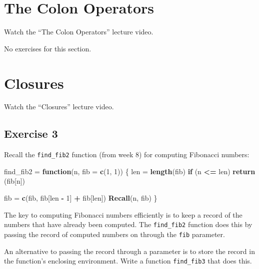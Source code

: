 \documentclass[
]{article}
\newenvironment{Shaded}{\begin{snugshade}}{\end{snugshade}}
\newcommand{\ControlFlowTok}[1]{\textcolor[rgb]{0.13,0.29,0.53}{\textbf{#1}}}
\newcommand{\DataTypeTok}[1]{\textcolor[rgb]{0.13,0.29,0.53}{#1}}
\newcommand{\DecValTok}[1]{\textcolor[rgb]{0.00,0.00,0.81}{#1}}
\newcommand{\KeywordTok}[1]{\textcolor[rgb]{0.13,0.29,0.53}{\textbf{#1}}}
\newcommand{\NormalTok}[1]{#1}
\newcommand{\OperatorTok}[1]{\textcolor[rgb]{0.81,0.36,0.00}{\textbf{#1}}}
\newcommand{\StringTok}[1]{\textcolor[rgb]{0.31,0.60,0.02}{#1}}
\begin{document}
\hypertarget{the-colon-operators}{%
\section{The Colon Operators}\label{the-colon-operators}}

Watch the ``The Colon Operators'' lecture video.

No exercises for this section.

\hypertarget{closures}{%
\section{Closures}\label{closures}}

Watch the ``Closures'' lecture video.

\hypertarget{exercise-3}{%
\subsection{Exercise 3}\label{exercise-3}}

Recall the \texttt{find\_fib2} function (from week 8) for computing
Fibonacci numbers:

\begin{Shaded}
\begin{Highlighting}[]
\NormalTok{find\_fib2 =}\StringTok{ }\ControlFlowTok{function}\NormalTok{(n, }\DataTypeTok{fib =} \KeywordTok{c}\NormalTok{(}\DecValTok{1}\NormalTok{, }\DecValTok{1}\NormalTok{)) \{}
\NormalTok{  len =}\StringTok{ }\KeywordTok{length}\NormalTok{(fib)}
  \ControlFlowTok{if}\NormalTok{ (n }\OperatorTok{\textless{}=}\StringTok{ }\NormalTok{len)}
    \KeywordTok{return}\NormalTok{ (fib[n])}
  
\NormalTok{  fib =}\StringTok{ }\KeywordTok{c}\NormalTok{(fib, fib[len }\OperatorTok{{-}}\StringTok{ }\DecValTok{1}\NormalTok{] }\OperatorTok{+}\StringTok{ }\NormalTok{fib[len])}
  \KeywordTok{Recall}\NormalTok{(n, fib)}
\NormalTok{\}}
\end{Highlighting}
\end{Shaded}

The key to computing Fibonacci numbers efficiently is to keep a record
of the numbers that have already been computed. The \texttt{find\_fib2}
function does this by passing the record of computed numbers on through
the \texttt{fib} parameter.

An alternative to passing the record through a parameter is to store the
record in the function's enclosing environment. Write a function
\texttt{find\_fib3} that does this.
\end{document}
